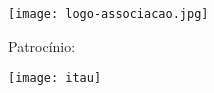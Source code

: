 {\begin{titlingpage}
\begin{figure}[b]
\begin{minipage}[c]{5cm}
				\vspace{1em}
				\texttt{[image: logo-associacao.jpg]}
			\end{minipage}\hfill
			\begin{minipage}[r]{5cm}
				\centering

				{\large Patrocínio:}

				\vspace{1em}
				\texttt{[image: itau]}
			\end{minipage}
		\end{figure}
		\clearpage
		\iftoggle{teacher}{
			\end{paracol}
		}{}
	\end{titlingpage}


	\undef\autor%
	\undef\autores%
	\undef\revisor%
	\undef\revisores%
	\revisaofalse%

	\let\la@versao\relax
	\undef\la@autorcapa
	\undef\la@graficos
	\undef\la@versaodigital
	\undef\la@ccbysa
}
